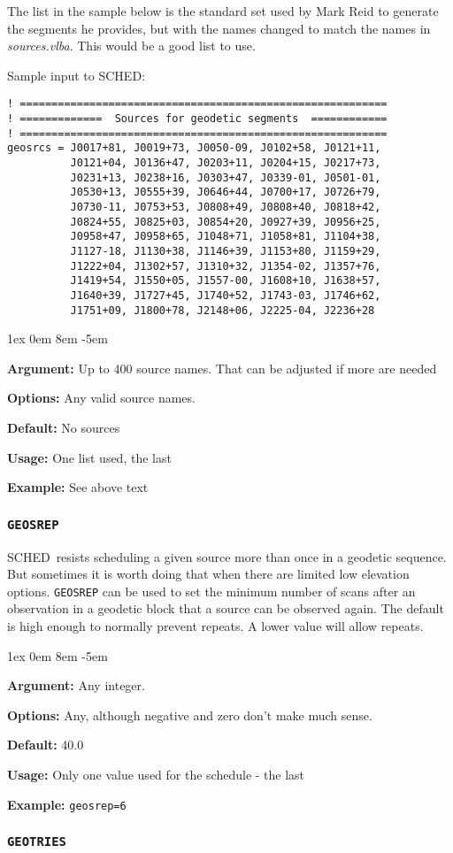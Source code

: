 \documentclass{report}
\newcommand{\sched}{{\sc SCHED}}
\newcommand{\schedb}{{\sc SCHED~}}
\newcommand{\rcwbox}[5]{
  \begin{list}{}{\parsep 1ex  \itemsep 0em
                 \leftmargin 8em  \itemindent -5em }
    \item {\bf Argument:} #1
    \item {\bf Options:}  #2
    \item {\bf Default:}  #3
    \item {\bf Usage:}    #4
    \item {\bf Example:}  #5
  \end{list}
}
\begin{document}
The list in the sample below is the standard set used by Mark Reid
to generate the segments he provides, but with the names changed
to match the names in {\sl sources.vlba}.  This would be a good list
to use.

Sample input to \sched:

\begin{verbatim}
! ==========================================================
! =============  Sources for geodetic segments  ============
! ==========================================================
geosrcs = J0017+81, J0019+73, J0050-09, J0102+58, J0121+11,
          J0121+04, J0136+47, J0203+11, J0204+15, J0217+73,
          J0231+13, J0238+16, J0303+47, J0339-01, J0501-01,
          J0530+13, J0555+39, J0646+44, J0700+17, J0726+79,
          J0730-11, J0753+53, J0808+49, J0808+40, J0818+42,
          J0824+55, J0825+03, J0854+20, J0927+39, J0956+25,
          J0958+47, J0958+65, J1048+71, J1058+81, J1104+38,
          J1127-18, J1130+38, J1146+39, J1153+80, J1159+29,
          J1222+04, J1302+57, J1310+32, J1354-02, J1357+76,
          J1419+54, J1550+05, J1557-00, J1608+10, J1638+57,
          J1640+39, J1727+45, J1740+52, J1743-03, J1746+62,
          J1751+09, J1800+78, J2148+06, J2225-04, J2236+28

\end{verbatim}

\rcwbox
{Up to 400 source names.  That can be adjusted if more are needed}
{Any valid source names.}
{No sources}
{One list used, the last}
{See above text}

\subsubsection{\label{MP:GEOSREP}{\tt GEOSREP}}

\schedb resists scheduling a given source more than once in a
geodetic sequence.  But sometimes it is worth doing that when there
are limited low elevation options.  {\tt GEOSREP} can be used to
set the minimum number of scans after an observation in a geodetic
block that a source can be observed again.  The default is high
enough to normally prevent repeats.  A lower value will allow repeats.

\rcwbox
{Any integer.}
{Any, although negative and zero don't make much sense.}
{40.0}
{Only one value used for the schedule - the last}
{{\tt geosrep=6}}


\subsubsection{\label{MP:GEOTRIES}{\tt GEOTRIES}}
\end{document}
